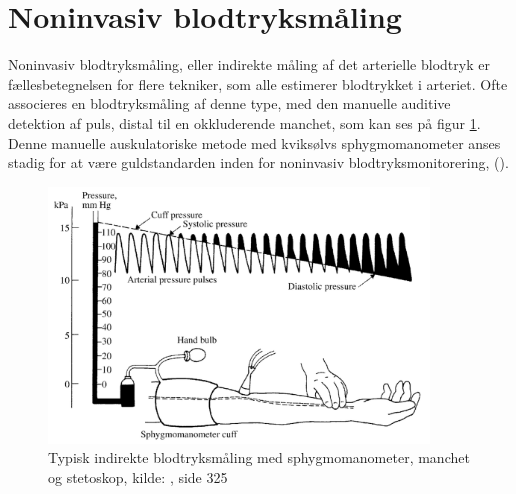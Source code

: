 \section{Noninvasiv blodtryksmåling}\label{noninvasivBloodpressureMeasurement}
Noninvasiv blodtryksmåling, eller indirekte måling af det arterielle blodtryk er fællesbetegnelsen for flere tekniker, som alle estimerer blodtrykket i arteriet. Ofte associeres en blodtryksmåling af denne type, med den manuelle auditive detektion af puls, distal til en okkluderende manchet, som kan ses på figur \ref{fig:audiotoryBloodpressureMeasurement}. Denne manuelle auskulatoriske metode med kviksølvs sphygmomanometer anses stadig for at være guldstandarden inden for noninvasiv blodtryksmonitorering, (\cite{RefWorks:24}).

\begin{figure}[H]
	\centering
	\includegraphics[width=0.9\textwidth]{billeder/TypicalIndirectBlood-pressureMeasurement.png}
	\caption{Typisk indirekte blodtryksmåling med sphygmomanometer, manchet og stetoskop, kilde: \cite{RefWorks:27}, side 325}\label{fig:audiotoryBloodpressureMeasurement}
\end{figure}

